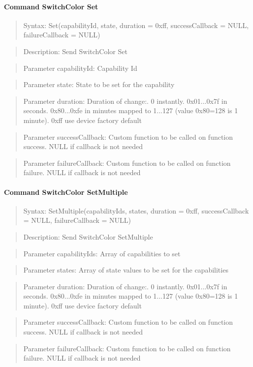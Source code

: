 \paragraph{Command SwitchColor Set}
\begin{quote}Syntax: Set(capabilityId, state, duration = 0xff, successCallback = NULL, failureCallback = NULL)\end{quote}
\begin{quote}Description: Send SwitchColor Set\end{quote}
\begin{quote}Parameter capabilityId: Capability Id\end{quote}
\begin{quote}Parameter state: State to be set for the capability\end{quote}
\begin{quote}Parameter duration: Duration of change:. 0 instantly. 0x01...0x7f in seconds. 0x80...0xfe in minutes mapped to 1...127 (value 0x80=128 is 1 minute). 0xff use device factory default\end{quote}
\begin{quote}Parameter successCallback: Custom function to be called on function success. NULL if callback is not needed\end{quote}
\begin{quote}Parameter failureCallback: Custom function to be called on function failure. NULL if callback is not needed\end{quote}


\paragraph{Command SwitchColor SetMultiple}
\begin{quote}Syntax: SetMultiple(capabilityIds, states, duration = 0xff, successCallback = NULL, failureCallback = NULL)\end{quote}
\begin{quote}Description: Send SwitchColor SetMultiple\end{quote}
\begin{quote}Parameter capabilityIds: Array of capabilities to set\end{quote}
\begin{quote}Parameter states: Array of state values to be set for the capabilities\end{quote}
\begin{quote}Parameter duration: Duration of change:. 0 instantly. 0x01...0x7f in seconds. 0x80...0xfe in minutes mapped to 1...127 (value 0x80=128 is 1 minute). 0xff use device factory default\end{quote}
\begin{quote}Parameter successCallback: Custom function to be called on function success. NULL if callback is not needed\end{quote}
\begin{quote}Parameter failureCallback: Custom function to be called on function failure. NULL if callback is not needed\end{quote}


